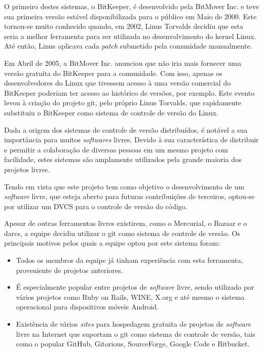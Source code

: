 O primeiro destes sistemas, o BitKeeper, é desenvolvido pela BitMover Inc. e teve sua primeira versão estável disponibilizada para o público em Maio de 2000.
Este tornou-se muito conhecido quando, em 2002, Linus Torvalds decidiu que esta seria a melhor ferramenta para ser utilizada no desenvolvimento do kernel Linux.
Até então, Linus aplicava cada \emph{patch} submetido pela comunidade manualmente.

Em Abril de 2005, a BitMover Inc. anunciou que não iria mais fornecer uma versão gratuita do BitKeeper para a comunidade.
Com isso, apenas os desenvolvedores do Linux que tivessem acesso à uma versão comercial do BitKeeper poderiam ter acesso ao histórico de versões, por exemplo.
Este evento levou à criação do projeto git, pelo próprio Linus Torvalds, que rapidamente substituiu o BitKeeper como sistema de controle de versão do Linux.

Dada a origem dos sistemas de controle de versão distribuídos, é notável a sua importância para muitos \emph{softwares} livres.
Devido à sua característica de distribuir e permitir a colaboração de diversas pessoas em um mesmo projeto com facilidade, estes sistemas são amplamente utilizados pela grande maioria dos projetos livres.

Tendo em vista que este projeto tem como objetivo o desenvolvimento de um \emph{software} livre, que esteja aberto para futuras contribuições de terceiros, optou-se por utilizar um DVCS para o controle de versão do código.

Apesar de outras ferramentas livres existirem, como o Mercurial, o Bazaar e o darcs, a equipe decidiu utilizar o git como sistema de controle de versão.
Os principais motivos pelos quais a equipe optou por este sistema foram:

\begin{itemize}
	\item Todos os membros da equipe já tinham experiência com esta ferramenta, proveniente de projetos anteriores.
	\item É especialmente popular entre projetos de \emph{software} livre, sendo utilizado por vários projetos como Ruby on Rails, WINE, X.org e até mesmo o sistema operacional para dispositivos móveis Android.
	\item Existência de vários \emph{sites} para hospedagem gratuita de projetos de \emph{software} livre na Internet que suportam o git como sistema de controle de versão, tais como o popular GitHub, Gitorious, SourceForge, Google Code e Bitbucket.
\end{itemize}

